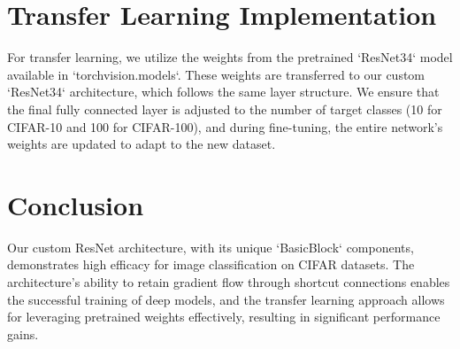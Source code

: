 \documentclass{article}
\begin{document}
\section{Transfer Learning Implementation}
For transfer learning, we utilize the weights from the pretrained `ResNet34` model available in `torchvision.models`. These weights are transferred to our custom `ResNet34` architecture, which follows the same layer structure. We ensure that the final fully connected layer is adjusted to the number of target classes (10 for CIFAR-10 and 100 for CIFAR-100), and during fine-tuning, the entire network's weights are updated to adapt to the new dataset.

\section{Conclusion}
Our custom ResNet architecture, with its unique `BasicBlock` components, demonstrates high efficacy for image classification on CIFAR datasets. The architecture's ability to retain gradient flow through shortcut connections enables the successful training of deep models, and the transfer learning approach allows for leveraging pretrained weights effectively, resulting in significant performance gains.
\end{document}
